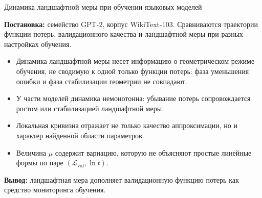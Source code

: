 \documentclass[10pt,pdf,hyperref={unicode}]{beamer}
\begin{document}
\begin{frame}{Динамика ландшафтной меры при обучении языковых моделей}
\justifying
\small

\textbf{Постановка:} семейство GPT-2, корпус WikiText-103. Сравниваются траектории функции потерь, валидационного качества и ландшафтной меры при разных настройках обучения.

\begin{itemize}
    \item Динамика ландшафтной меры несет информацию о геометрическом режиме обучения, не сводимую к одной только функции потерь: фаза уменьшения ошибки и фаза стабилизации геометрии не совпадают.
    \item У части моделей динамика немонотонна: убывание потерь сопровождается ростом или стабилизацией ландшафтной меры.
    \item Локальная кривизна отражает не только качество аппроксимации, но и характер найденной области параметров.
    \item Величина $\mu$ содержит вариацию, которую не объясняют простые линейные формы по паре $(\mathcal{L}_{\mathrm{val}},\ln t)$.
\end{itemize}

\textbf{Вывод:} ландшафтная мера дополняет валидационную функцию потерь как средство мониторинга обучения.
\end{frame}
\end{document}
